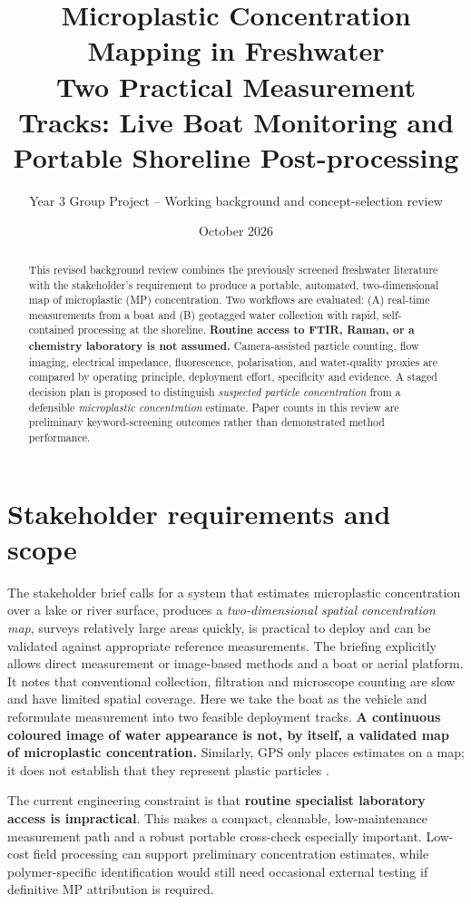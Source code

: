 \documentclass[10pt,a4paper]{article}
\title{\bfseries Microplastic Concentration Mapping in Freshwater\\[4pt]
\large Two Practical Measurement Tracks: Live Boat Monitoring and Portable Shoreline Post-processing}
\author{Year 3 Group Project -- Working background and concept-selection review}
\date{October 2026}
\begin{document}
\maketitle
\begin{abstract}
This revised background review combines the previously screened freshwater literature with the stakeholder's requirement to produce a portable, automated, two-dimensional map of microplastic (MP) concentration. Two workflows are evaluated: (A) real-time measurements from a boat and (B) geotagged water collection with rapid, self-contained processing at the shoreline. \textbf{Routine access to FTIR, Raman, or a chemistry laboratory is not assumed.} Camera-assisted particle counting, flow imaging, electrical impedance, fluorescence, polarisation, and water-quality proxies are compared by operating principle, deployment effort, specificity and evidence. A staged decision plan is proposed to distinguish \emph{suspected particle concentration} from a defensible \emph{microplastic concentration} estimate. Paper counts in this review are preliminary keyword-screening outcomes rather than demonstrated method performance.
\end{abstract}

\section{Stakeholder requirements and scope}
The stakeholder brief calls for a system that estimates microplastic concentration over a lake or river surface, produces a \emph{two-dimensional spatial concentration map}, surveys relatively large areas quickly, is practical to deploy and can be validated against appropriate reference measurements. The briefing explicitly allows direct measurement or image-based methods and a boat or aerial platform. It notes that conventional collection, filtration and microscope counting are slow and have limited spatial coverage. Here we take the boat as the vehicle and reformulate measurement into two feasible deployment tracks. \textbf{A continuous coloured image of water appearance is not, by itself, a validated map of microplastic concentration.} Similarly, GPS only places estimates on a map; it does not establish that they represent plastic particles \cite{Chen2021,Chen2023,Blevins2021}.

The current engineering constraint is that \textbf{routine specialist laboratory access is impractical}. This makes a compact, cleanable, low-maintenance measurement path and a robust portable cross-check especially important. Low-cost field processing can support preliminary concentration estimates, while polymer-specific identification would still need occasional external testing if definitive MP attribution is required.
\end{document}
